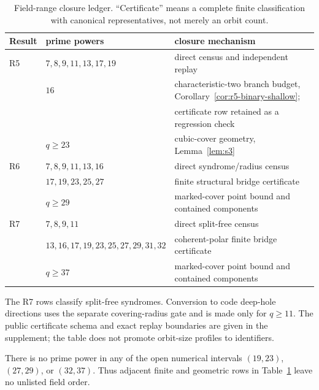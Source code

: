 \begin{table}[ht]
\centering
\small
\caption{Field-range closure ledger.  ``Certificate'' means a complete
finite classification with canonical representatives, not merely an
orbit count.}
\label{tab:field-ranges}
\begin{tabular}{lll}
\toprule
Result & prime powers & closure mechanism\\
\midrule
R5 & $7,8,9,11,13,17,19$ & direct census and independent replay\\
   & $16$ & characteristic-two branch budget,
       Corollary~\ref{cor:r5-binary-shallow};\\
   & & certificate row retained as a regression check\\
   & $q\geq23$ & cubic-cover geometry, Lemma~\ref{lem:s3}\\
R6 & $7,8,9,11,13,16$ & direct syndrome/radius census\\
   & $17,19,23,25,27$ & finite structural bridge certificate\\
   & $q\geq29$ & marked-cover point bound and contained components\\
R7 & $7,8,9,11$ & direct split-free census\\
   & $13,16,17,19,23,25,27,29,31,32$ &
       coherent-polar finite bridge certificate\\
   & $q\geq37$ & marked-cover point bound and contained components\\
\bottomrule
\end{tabular}
\end{table}

The R7 rows classify split-free syndromes.  Conversion to code
deep-hole directions uses the separate covering-radius gate and is
made only for $q\geq11$.  The public certificate schema and exact
replay boundaries are given in the supplement; the table does not
promote orbit-size profiles to identifiers.

There is no prime power in any of the open numerical intervals
\((19,23)\), \((27,29)\), or \((32,37)\).  Thus adjacent finite and
geometric rows in Table~\ref{tab:field-ranges} leave no unlisted field
order.
